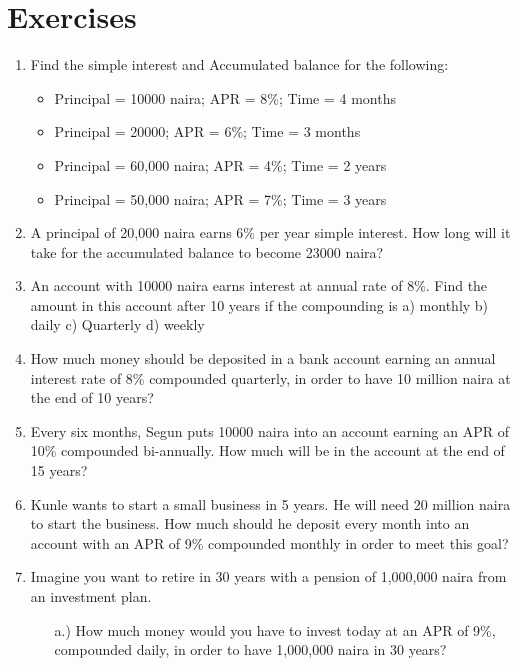 \documentclass{article}
\begin{document}
			\newpage
			\section{Exercises}
				\begin{enumerate}
					\item Find the simple interest and Accumulated balance for the following:
					\begin{itemize}
						\item Principal = 10000 naira; APR = 8\%; Time = 4 months
						\item Principal = 20000; APR = 6\%; Time = 3 months
						\item Principal = 60,000 naira; APR = 4\%; Time = 2 years
						\item Principal = 50,000 naira; APR = 7\%; Time = 3 years
					\end{itemize}
				
					\item A principal of 20,000 naira earns 6\% per year simple interest. How long will it take for the accumulated balance to become 23000 naira?
					
					\item An account with 10000 naira earns interest at annual rate of  8\%. Find the amount in this account after 10 years if the compounding is   a) monthly    b) daily     c) Quarterly   d) weekly
					
					\item How much money should be deposited in a bank account earning an annual interest rate of 8\% compounded quarterly, in order to have 10 million naira at the end of 10 years?
					
					\item Every six months, Segun puts 10000 naira into an account earning an APR of 10\% compounded bi-annually. How much will be in the account at the end of 15 years?
					
					
					\item Kunle wants to start a small business in 5 years. He will need 20 million naira to start the business. How much should he deposit every month into an account with an APR of 9\% compounded monthly in order to meet this goal?
					
					\item Imagine you want to retire in 30 years with a pension of 1,000,000 naira from an investment plan.  
					
						\begin{itemize}
							\item [a.)] {How much money would you have to invest today at an APR of 9\%, compounded daily, in order to have 1,000,000 naira in 30 years?}
							

\end{itemize}
\end{enumerate}
\end{document}
